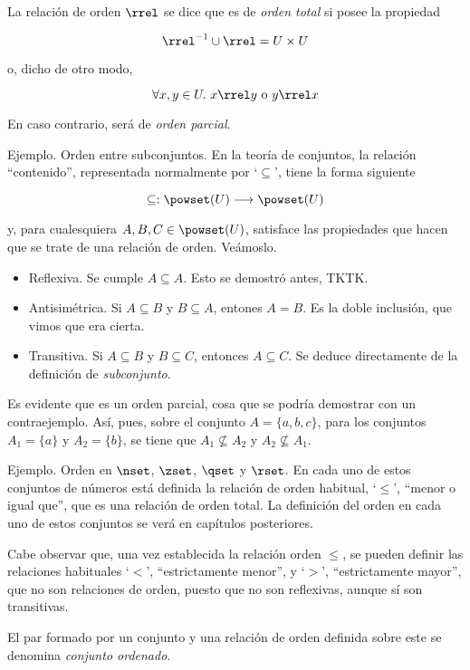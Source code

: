 La relación de orden $\rrel$ se dice que es de \emph{orden total} si posee
la propiedad

$$ \rrel^{-1} \cup \rrel = U \times U $$

\noindent o, dicho de otro modo,

$$ \forall x, y \in U. \ x \rrel y \ \text{o} \ y \rrel x $$

\noindent En caso contrario, será de \emph{orden parcial}.

Ejemplo. Orden entre subconjuntos. En la teoría de conjuntos, la relación
``contenido'', representada normalmente por `$\subseteq$', tiene la forma
siguiente

$$ \subseteq: \powset(U) \longrightarrow \powset(U) $$

\noindent y, para cualesquiera $A, B, C \in \powset(U)$, satisface las
propiedades que hacen que se trate de una relación de orden. Veámoslo.

\begin{itemize}
  \item Reflexiva. Se cumple $A \subseteq A$. Esto se demostró antes, TKTK.
  \item Antisimétrica. Si $A \subseteq B$ y $B \subseteq A$, entones $A =
    B$. Es la doble inclusión, que vimos que era cierta.
  \item Transitiva. Si $A \subseteq B$ y $B \subseteq C$, entonces $A
    \subseteq C$. Se deduce directamente de la definición de
    \emph{subconjunto}.
\end{itemize}

Es evidente que es un orden parcial, cosa que se podría demostrar con un
contraejemplo. Así, pues, sobre el conjunto $A = \{a, b, c\}$, para los
conjuntos $A_1 = \{a\}$ y $A_2 = \{b\}$, se tiene que $A_1 \not\subseteq
A_2$ y $A_2 \not\subseteq A_1$.

Ejemplo. Orden en $\nset$, $\zset$, $\qset$ y $\rset$. En cada uno de estos
conjuntos de números está definida la relación de orden habitual, `$\leq$',
``menor o igual que'', que es una relación de orden total. La definición del
orden en cada uno de estos conjuntos se verá en capítulos posteriores.

Cabe observar que, una vez establecida la relación orden $\leq$, se pueden
definir las relaciones habituales `$<$', ``estrictamente menor'', y `$>$',
``estrictamente mayor'', que no son relaciones de orden, puesto que no son
reflexivas, aunque sí son transitivas.

El par formado por un conjunto y una relación de orden definida sobre este
se denomina \emph{conjunto ordenado}.

